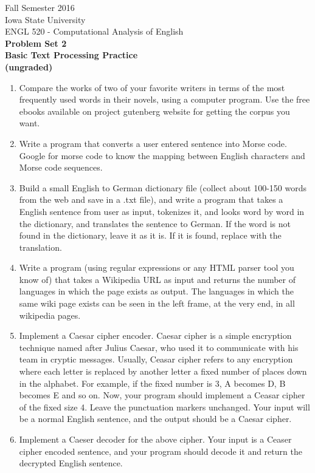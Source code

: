 \documentclass[11pt,a4paper]{article}
\begin{document}
\begin{center}
  Fall Semester 2016 \\ Iowa State University\\[3ex]
  {\large ENGL 520 - Computational Analysis of English}\\[3ex]
  \textbf{Problem Set 2} \\ \textbf{Basic Text Processing Practice \\ (ungraded)}
\end{center}

\begin{enumerate}
\item Compare the works of two of your favorite writers in terms of the most frequently used words in their novels, using a computer program. Use the free ebooks available on project gutenberg website for getting the corpus you want.
\item Write a program that converts a user entered sentence into Morse code. Google for morse code to know the mapping between English characters and Morse code sequences.
\item Build a small English to German dictionary file (collect about 100-150 words from the web and save in a .txt file), and write a program that takes a English sentence from user as input, tokenizes it, and looks word by word in the dictionary, and translates the sentence to German. If the word is not found in the dictionary, leave it as it is. If it is found, replace with the translation.
\item Write a program (using regular expressions or any HTML parser tool you know of) that takes a Wikipedia URL as input and returns the number of languages in which the page exists as output. The languages in which the same wiki page exists can be seen in the left frame, at the very end, in all wikipedia pages.
\item Implement a Caesar cipher encoder. Caesar cipher is a simple encryption technique named after Julius Caesar, who used it to communicate with his team in cryptic messages. Usually, Ceasar cipher refers to any encryption where each letter is replaced by another letter a fixed number of places down in the alphabet. For example, if the fixed number is 3, A becomes D, B becomes E and so on. Now, your program should implement a Ceasar cipher of the fixed size 4. Leave the punctuation markers unchanged. Your input will be a normal English sentence, and the output should be a Caesar cipher.
\item Implement a Caeser decoder for the above cipher. Your input is a Ceaser cipher encoded sentence, and your program should decode it and return the decrypted English sentence.

\end{enumerate}
\end{document}
